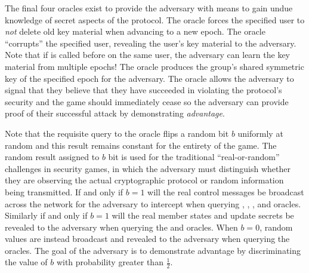 The final four oracles exist to provide the adversary with means to gain undue knowledge of secret aspects of the  protocol.
The  oracle forces the specified user to \emph{not} delete old key material when advancing to a new epoch.
The  oracle ``corrupts'' the specified user, revealing the user's key material to the adversary. Note that if  is called before  on the same user, the adversary can learn the key material from multiple epochs!
The  oracle produces the group's shared symmetric key of the specified epoch for the adversary.
The  oracle allows the adversary to signal that they believe that they have succeeded in violating the  protocol's security and the game should immediately cease so the adversary can provide proof of their successful attack by demonstrating \emph{advantage}.

Note that the requisite query to the  oracle flips a random bit \(b\) uniformly at random and this result remains constant for the entirety of the game.
The random result assigned to \(b\) bit is used for the traditional ``real-or-random'' challenges in security games, in which the adversary must distinguish whether they are observing the actual cryptographic protocol or random information being transmitted.
If and only if \(b=1\) will the real control messages be broadcast across the network for the adversary to intercept when querying , , , and  oracles.
Similarly if and only if \(b=1\) will the real member states and update secrets be revealed to the adversary when querying the  and  oracles.
When \(b=0\), random values are instead broadcast and revealed to the adversary when querying the oracles.
The goal of the adversary is to demonstrate advantage by discriminating the value of \(b\) with probability greater than \(\frac{1}{2}\).

